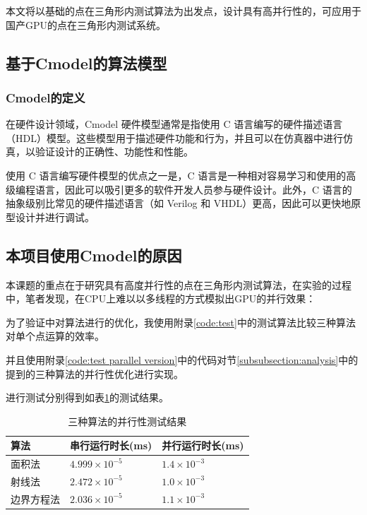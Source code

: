 本文将以基础的点在三角形内测试算法为出发点，设计具有高并行性的，可应用于国产GPU的点在三角形内测试系统。





\subsection{基于Cmodel的算法模型}

\subsubsection{Cmodel的定义}
在硬件设计领域，Cmodel 硬件模型通常是指使用 C 语言编写的硬件描述语言（HDL）模型。这些模型用于描述硬件功能和行为，并且可以在仿真器中进行仿真，以验证设计的正确性、功能性和性能。

使用 C 语言编写硬件模型的优点之一是，C 语言是一种相对容易学习和使用的高级编程语言，因此可以吸引更多的软件开发人员参与硬件设计。此外，C 语言的抽象级别比常见的硬件描述语言（如 Verilog 和 VHDL）更高，因此可以更快地原型设计并进行调试。

\subsection{本项目使用Cmodel的原因}

本课题的重点在于研究具有高度并行性的点在三角形内测试算法，在实验的过程中，笔者发现，在CPU上难以以多线程的方式模拟出GPU的并行效果：

为了验证中对算法进行的优化，我使用附录\ref{code:test}中的测试算法比较三种算法对单个点运算的效率。

并且使用附录\ref{code:test parallel version}中的代码对节\ref{subsubsection:analysis}中的提到的三种算法的并行性优化进行实现。

进行测试分别得到如表\ref{tab:test result}的测试结果。

\begin{table}[ht]
    \caption{\label{tab:test result}三种算法的并行性测试结果}
    \begin{tabularx}{\linewidth}{|XXX|}
        \hline
        算法 & 串行运行时长(ms) & 并行运行时长(ms) \\ \hline
        面积法 & $4.999 \times 10^{-5}$ & $1.4 \times 10^{-3}$ \\ \hline
        射线法 & $2.472 \times 10^{-5}$ & $1.0 \times 10^{-3}$  \\ \hline
        边界方程法 & $2.036 \times 10^{-5}$ & $1.1 \times 10^{-3}$  \\ \hline
    \end{tabularx}
\end{table}


